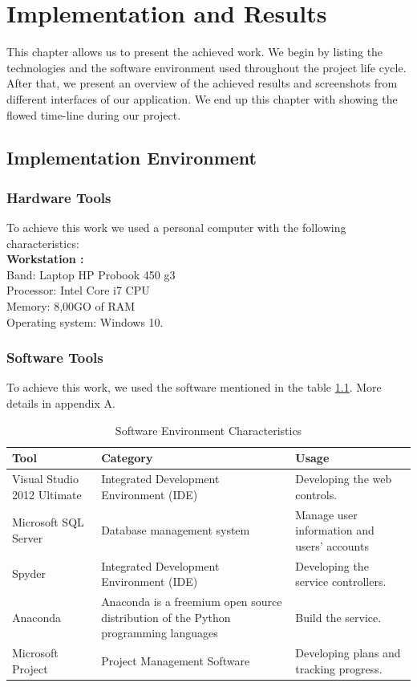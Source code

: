 \chapter{Implementation and Results}
\label{Chapter5} 


This chapter allows us to present the achieved work. We begin by listing the technologies and the software environment used throughout the project life cycle. After that, we present an overview of the achieved results and screenshots from different interfaces of our application. We end up this chapter with showing the flowed time-line during our project. 



\section{Implementation Environment}
\subsection{Hardware Tools}
To achieve this work we used a personal computer with the following characteristics:\\	

{\bf Workstation :}\\
Band: Laptop HP Probook 450 g3\\
Processor: Intel Core i7 CPU\\
Memory: 8,00GO of RAM\\
Operating system: Windows 10.


\subsection{Software Tools}

To achieve this work, we used  the software mentioned in the table \ref{sf}. More details in appendix A.
\begin{table}[!h]
\caption{Software Environment Characteristics}
\begin{center}
\begin{tabularx}{17cm}{ |p{4cm}|X|X| } 
 \hline
 \textbf{Tool} & \textbf{Category} & \textbf{Usage} \\ \hline
 Visual Studio 2012 Ultimate & Integrated Development Environment (IDE) & Developing the web controls.\\ \hline
Microsoft SQL Server & Database management system & Manage user information and users' accounts\\ \hline
Spyder & Integrated Development Environment (IDE) & Developing the service controllers.\\ \hline
Anaconda & Anaconda is a freemium open source distribution of the Python programming languages & Build the service.\\ \hline
Microsoft Project & Project Management Software & Developing plans and tracking progress. \\ \hline
\end{tabularx}
\end{center}
\label{sf}
\end{table}
